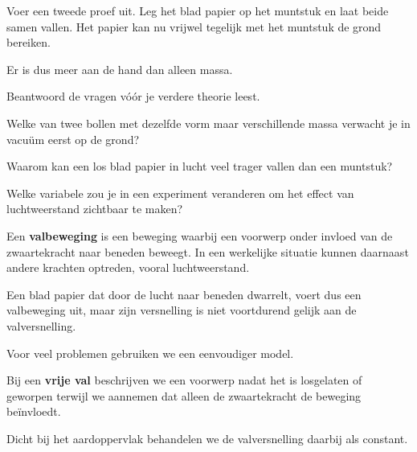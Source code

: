 \documentclass{ximera}
\begin{document}
Voer een tweede proef uit. Leg het blad papier op het muntstuk en laat
beide samen vallen. Het papier kan nu vrijwel tegelijk met het
muntstuk de grond bereiken.

Er is dus meer aan de hand dan alleen massa.

\begin{oefening}{\oefB\ESS}

Beantwoord de vragen vóór je verdere theorie leest.

\begin{question}
Welke van twee bollen met dezelfde vorm maar verschillende massa
verwacht je in vacuüm eerst op de grond?
\end{question}

\begin{question}
Waarom kan een los blad papier in lucht veel trager vallen dan een
muntstuk?
\end{question}

\begin{question}
Welke variabele zou je in een experiment veranderen om het effect van
luchtweerstand zichtbaar te maken?
\end{question}

\end{oefening}




Een \textbf{valbeweging} is een beweging waarbij een voorwerp onder
invloed van de zwaartekracht naar beneden beweegt. In een werkelijke
situatie kunnen daarnaast andere krachten optreden, vooral
luchtweerstand.

Een blad papier dat door de lucht naar beneden dwarrelt, voert dus een
valbeweging uit, maar zijn versnelling is niet voortdurend gelijk aan
de valversnelling.

Voor veel problemen gebruiken we een eenvoudiger model.

\begin{definitie}

Bij een \textbf{vrije val} beschrijven we een voorwerp nadat het is
losgelaten of geworpen terwijl we aannemen dat alleen de zwaartekracht
de beweging beïnvloedt.

Dicht bij het aardoppervlak behandelen we de valversnelling daarbij
als constant.

\end{definitie}
\end{document}
